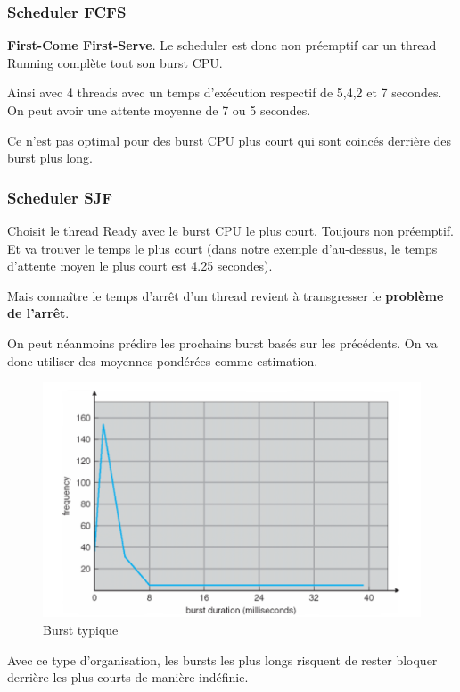 \subsubsection{Scheduler FCFS}\label{scheduler-fcfs}

\textbf{First-Come First-Serve}. Le scheduler est donc non préemptif car
un thread Running complète tout son burst CPU.

Ainsi avec 4 threads avec un temps d'exécution respectif de 5,4,2 et 7
secondes. On peut avoir une attente moyenne de 7 ou 5 secondes.

Ce n'est pas optimal pour des burst CPU plus court qui sont coincés
derrière des burst plus long.

\subsubsection{Scheduler SJF}\label{scheduler-sjf}

Choisit le thread Ready avec le burst CPU le plus court. Toujours non
préemptif. Et va trouver le temps le plus court (dans notre exemple
d'au-dessus, le temps d'attente moyen le plus court est 4.25 secondes).

Mais connaître le temps d'arrêt d'un thread revient à transgresser le
\textbf{problème de l'arrêt}.

On peut néanmoins prédire les prochains burst basés sur les précédents.
On va donc utiliser des moyennes pondérées comme estimation.

\begin{figure}
\centering
\includegraphics{image-31.png}
\caption{Burst typique}
\end{figure}

Avec ce type d'organisation, les bursts les plus longs risquent de
rester bloquer derrière les plus courts de manière indéfinie.

